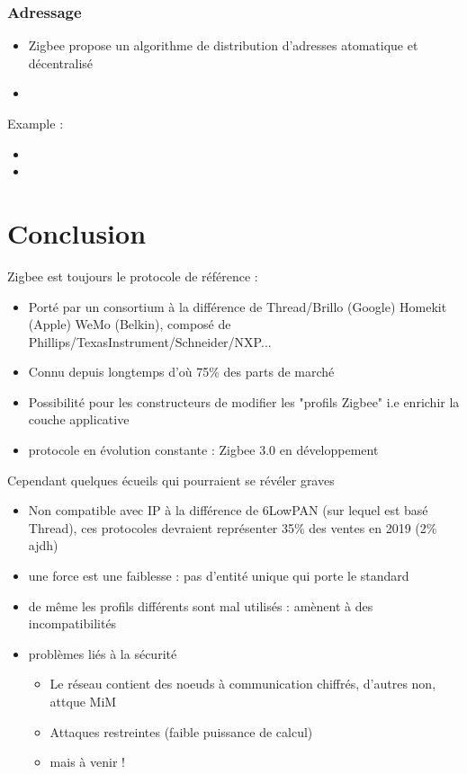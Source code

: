 \documentclass{beamer}
\begin{document}
  \begin{frame}
    \frametitle{Adressage}
    \begin{itemize}
      \item Zigbee propose un algorithme de distribution d'adresses atomatique et décentralisé
      \item 
    \end{itemize}
    Example : 
    \begin{itemize}
      \item 
      \item 
    \end{itemize}
  \end{frame}

\section{Conclusion}
  \begin{frame}
  	\begin{block}{Zigbee est toujours le protocole de référence :}
	\begin{itemize}
		\item Porté par un consortium à la différence de Thread/Brillo (Google) Homekit (Apple) WeMo (Belkin), composé de Phillips/TexasInstrument/Schneider/NXP...
		\item Connu depuis longtemps d'où 75\% des parts de marché
		\item Possibilité pour les constructeurs de modifier les "profils Zigbee" i.e enrichir la couche applicative
		\item protocole en évolution constante : Zigbee 3.0 en développement
\end{itemize}  
\end{block}
\end{frame}
  

\begin{frame}
	  \begin{block}{Cependant quelques écueils qui pourraient se révéler graves}
	  \begin {itemize}
  \item Non compatible avec IP à la différence de 6LowPAN (sur lequel est basé Thread), ces protocoles devraient représenter 35\% des ventes en 2019 (2\% ajdh)
  \item une force est une faiblesse : pas d'entité unique qui porte le standard 
  \item de même les profils différents sont mal utilisés : amènent à des incompatibilités
  \item problèmes liés à la sécurité
\begin{itemize}
	\item Le réseau contient des noeuds à communication chiffrés, d'autres non, attque MiM
	\item Attaques restreintes (faible puissance de calcul)
	\item mais à venir !
\end{itemize}
  \end{itemize}
\end{block}
  \end{frame}

  
\end{document}
